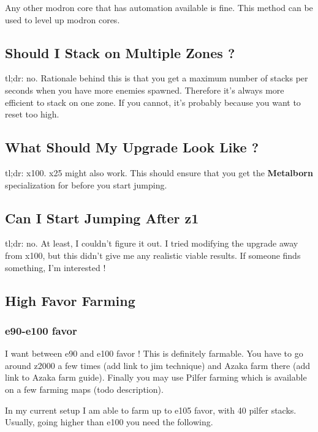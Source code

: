 \documentclass{article}
\begin{document}
Any other modron core that has automation available is fine.
This method can be used to level up modron cores.


\subsection{Should I Stack on Multiple Zones ?}

tl;dr: no.\newline
Rationale behind this is that you get a maximum number of stacks per seconds when you have more enemies spawned.
Therefore it's always more efficient to stack on one zone.
If you cannot, it's probably because you want to reset too high.



\subsection{What Should My Upgrade Look Like ?}

tl;dr: x100.\newline
x25 might also work.
This should ensure that you get the \textbf{Metalborn} specialization for \briv before you start jumping.


\subsection{Can I Start Jumping After z1}

tl;dr: no.\newline
At least, I couldn't figure it out.
I tried modifying the upgrade away from x100, but this didn't give me any realistic viable results.
If someone finds something, I'm interested !


\subsection{High Favor Farming}

\subsubsection{e90-e100 favor}
I want between e90 and e100 favor !
This is definitely farmable.
You have to go around z2000 a few times (add link to jim technique) and Azaka farm there (add link to Azaka farm guide).
Finally you may use Pilfer farming which is available on a few farming maps (todo description).

In my current setup I am able to farm up to e105 favor, with 40 pilfer stacks.
Usually, going higher than e100 you need the following.
\end{document}
